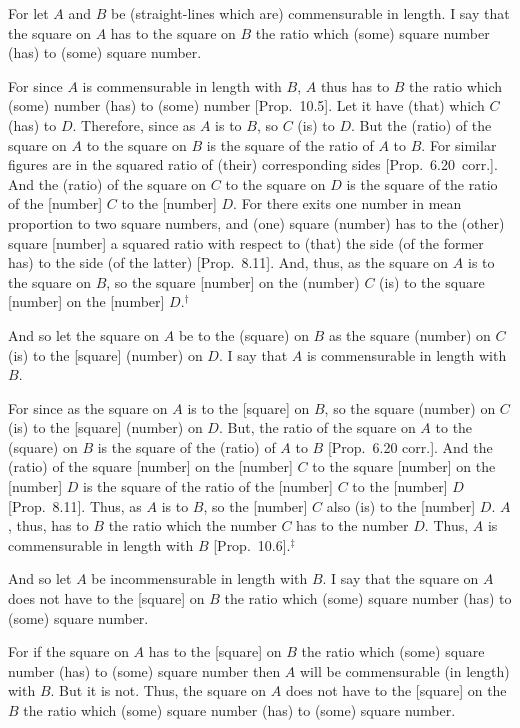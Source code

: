 \epsfysize=0.5in
\centerline{}

For let $A$ and $B$ be (straight-lines which are) commensurable in length.
I say that the square on $A$ has to the square on $B$ the ratio
which (some) square number (has) to (some) square number.

For since $A$ is commensurable in length with $B$, $A$ thus
has to $B$ the ratio which (some) number (has) to (some) number [Prop.~10.5]. Let it have (that) which $C$ (has) to $D$.
Therefore, since as $A$ is to $B$, so $C$ (is) to $D$. But the (ratio)
of the square on $A$ to the square on $B$ is the square of the
ratio of $A$ to $B$. For similar figures are in the squared ratio of (their) corresponding sides [Prop.~6.20~corr.].
And the (ratio) of the square on $C$ to the square on $D$ is the
square of the ratio of the [number] $C$ to the [number] $D$.
For there exits one number in mean proportion to two square numbers,
and (one) square (number) has to the (other) square [number] a squared ratio
with respect to (that) the side (of the former has) to the side (of the latter)
[Prop.~8.11]. And, thus,  as the square on $A$
is to the square on $B$, so the square  [number] on the (number) $C$ (is) to
the square [number] on the [number] $D$.$^\dag$

And so let the square on $A$ be to the (square) on $B$ as the
square (number) on $C$ (is) to the [square] (number) on $D$. I say
that $A$ is commensurable in length  with $B$.

For since as the square on $A$ is to the [square] on $B$, so the
square (number) on $C$ (is) to the [square] (number) on $D$. But,
the ratio of the square on $A$ to the (square) on $B$ is the square
of the (ratio) of $A$ to $B$ [Prop.~6.20 corr.].
And the (ratio) of the square [number] on the [number] $C$ to
the square [number] on the [number] $D$ is the square of the ratio
of the [number] $C$ to the [number] $D$ [Prop.~8.11].  Thus, as $A$ is to $B$, so the
[number] $C$ also (is) to the [number] $D$.
$A$, thus,  has to $B$ the ratio
which the number $C$ has to the number $D$. Thus, $A$ is
commensurable in length with $B$ [Prop.~10.6].$^\ddag$

And so let $A$ be incommensurable in length with $B$. I say that
 the square on $A$ does not have to the [square] on $B$ the ratio
which (some) square number (has) to (some) square number.

For if the square on $A$ has to the [square] on $B$ the ratio which
(some) square number (has) to (some) square number then $A$
will be commensurable (in length) with $B$. But it is not. Thus, the square on $A$
does not have to the [square] on the $B$ the ratio which (some)
square number (has) to (some) square number.

